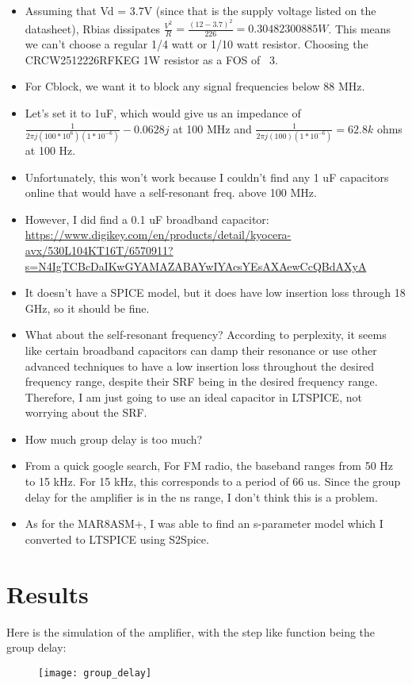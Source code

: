 \documentclass[12pt, letterpaper]{article}
\begin{document}
\begin{itemize}
    \item Assuming that Vd = 3.7V (since that is the supply voltage listed on the datasheet), Rbias dissipates \(\frac{V^2}{R} = \frac{(12-3.7)^2}{226} = 0.30482300885 W\). This means we can't choose a regular 1/4 watt or 1/10 watt resistor. Choosing the CRCW2512226RFKEG 1W resistor as a FOS of ~3. 
    \item For Cblock, we want it to block any signal frequencies below 88 MHz. 
    \item Let's set it to 1uF, which would give us an impedance of \(\frac{1}{2\pi j (100*10^6) (1*10^{-6})} -0.0628j \) at 100 MHz and \(\frac{1}{2\pi j (100) (1*10^{-6})} = 62.8k\) ohms at 100 Hz.
    \item Unfortunately, this won't work because I couldn't find any 1 uF capacitors online that would have a self-resonant freq. above 100 MHz.
    \item However, I did find a 0.1 uF broadband capacitor: \url{https://www.digikey.com/en/products/detail/kyocera-avx/530L104KT16T/6570911?s=N4IgTCBcDaIKwGYAMAZABAYwIYAcsYEsAXAewCcQBdAXyA}
    \item It doesn't have a SPICE model, but it does have low insertion loss through 18 GHz, so it should be fine.
    \item What about the self-resonant frequency? According to perplexity, it seems like certain broadband capacitors can damp their resonance or use other advanced techniques to have a low insertion loss throughout the desired frequency range, despite their SRF being in the desired frequency range. Therefore, I am just going to use an ideal capacitor in LTSPICE, not worrying about the SRF.
    \item How much group delay is too much?
    \item From a quick google search, For FM radio, the baseband ranges from 50 Hz to 15 kHz. For 15 kHz, this corresponds to a period of 66 us. Since the group delay for the amplifier is in the ns range, I don't think this is a problem.
    \item As for the MAR8ASM+, I was able to find an s-parameter model which I converted to LTSPICE using S2Spice.
\end{itemize}

\section{Results}
Here is the simulation of the amplifier, with the step like function being the group delay:
\begin{figure}[h]
\texttt{[image: group\_delay]}
\end{figure}
\end{document}
